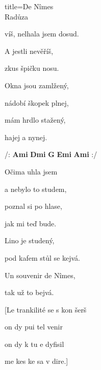 \begin{song}{title=\predtitle\centering De N\^{i}mes \\\large Radůza  \vspace*{-0.3cm}}
\begin{centerjustified}
\begin{varwidth}[t]{0.48\textwidth}
	víš, nelhala jsem dosud.

	A jestli nevěříš,
	
	zkus špičku nosu.

	Okna jsou zamlžený,

	nádobí škopek plnej,

	mám hrdlo stažený,
	
	hajej a nynej.



\phantom{.}


/: \textbf{Ami\,\,Dmi\,\,G\,\,Emi\,\,Ami} :/
       

\sloka
	Očima uhla jsem
	
	a nebylo to studem,
	
	poznal si po hlase,

	jak mi teď bude.
	
	Lino je studený,

	pod kafem stůl se kejvá.
	
	Un souvenir de N\^{i}mes,
	
	tak už to bejvá.





\end{varwidth}
\end{centerjustified}

\vspace*{1.5cm}
\begin{centerjustified}
\begin{varwidth}[t]{0.48\textwidth}\setlength{\parindent}{0.45cm}  %

\end{varwidth}\begin{varwidth}[t]{0.48\textwidth}\setlength{\parindent}{0.45cm}%
\ssloka{}
[Le trankilité se s kon šerš

  on dy pui tel venir

  on dy k tu e dyfisil

  me kes ke sa v dire.]
\end{varwidth}

\end{centerjustified}
\setcounter{Slokočet}{0}
\end{song}
